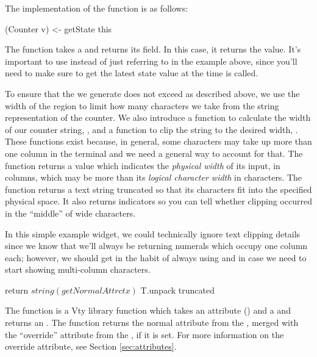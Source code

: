 The implementation of the  function is as follows:

\begin{haskellcode}
 (Counter v) <- getState this
\end{haskellcode}

The  function takes a  and returns its
 field.  In this case, it returns the  value.
It's important to use  instead of just referring to
 in the example above, since you'll need to make sure to get
the latest state value at the time  is called.


To ensure that the  we generate does not exceed  as
described above, we use the width of the region to limit how many
characters we take from the string representation of the counter.  We
also introduce a function to calculate the width of our counter
string, , and a function to clip the string to the
desired width, .  These functions exist because, in
general, some characters may take up more than one column in the
terminal and we need a general way to account for that.  The
 function returns a  value which indicates the
\textit{physical width} of its input, in columns, which may be more
than its \textit{logical character width} in characters.  The
 function returns a text string truncated so that its
characters fit into the specified physical space.  It also returns
 indicators so you can tell whether clipping occurred in the
``middle'' of wide characters.

In this simple example widget, we could technically ignore text
clipping details since we know that we'll always be returning numerals
which occupy one column each; however, we should get in the habit of
always using  and  in case we need to start
showing multi-column characters.

\begin{haskellcode}
 return $ string (getNormalAttr ctx) $ T.unpack truncated
\end{haskellcode}
The  function is a Vty library function which takes an
attribute () and a  and returns an .
The  function returns the normal attribute from the
, merged with the ``override'' attribute from the
, if it is set.  For more information on the
override attribute, see Section \ref{sec:attributes}.

